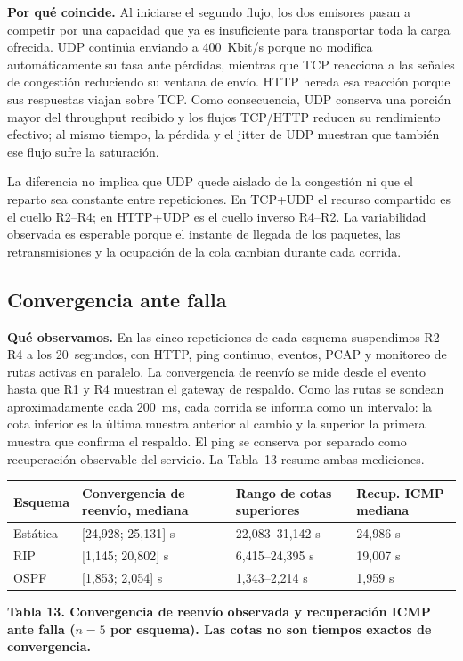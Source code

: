 \documentclass[11pt,a4paper]{article}
\newcommand{\figcaption}[1]{\par\noindent\footnotesize\textbf{#1}\par\vspace{0.4cm}}
\begin{document}
\textbf{Por qu\'e coincide.} Al iniciarse el segundo flujo, los dos emisores pasan a competir por una capacidad que ya es insuficiente para transportar toda la carga ofrecida. UDP contin\'ua enviando a 400~Kbit/s porque no modifica autom\'aticamente su tasa ante p\'erdidas, mientras que TCP reacciona a las se\~nales de congesti\'on reduciendo su ventana de env\'io. HTTP hereda esa reacci\'on porque sus respuestas viajan sobre TCP. Como consecuencia, UDP conserva una porci\'on mayor del throughput recibido y los flujos TCP/HTTP reducen su rendimiento efectivo; al mismo tiempo, la p\'erdida y el jitter de UDP muestran que tambi\'en ese flujo sufre la saturaci\'on.

La diferencia no implica que UDP quede aislado de la congesti\'on ni que el reparto sea constante entre repeticiones. En TCP+UDP el recurso compartido es el cuello R2--R4; en HTTP+UDP es el cuello inverso R4--R2. La variabilidad observada es esperable porque el instante de llegada de los paquetes, las retransmisiones y la ocupaci\'on de la cola cambian durante cada corrida.

\subsection*{Convergencia ante falla}

\textbf{Qu\'e observamos.} En las cinco repeticiones de cada esquema suspendimos R2--R4 a los 20~segundos, con HTTP, ping continuo, eventos, PCAP y monitoreo de rutas activas en paralelo. La convergencia de reenv\'io se mide desde el evento hasta que R1 y R4 muestran el gateway de respaldo. Como las rutas se sondean aproximadamente cada 200~ms, cada corrida se informa como un intervalo: la cota inferior es la \`ultima muestra anterior al cambio y la superior la primera muestra que confirma el respaldo. El ping se conserva por separado como recuperaci\'on observable del servicio. La Tabla~13 resume ambas mediciones.

\needspace{1cm}
\begin{center}
\begin{minipage}{0.96\linewidth}
\centering
\small
\renewcommand{\arraystretch}{1.2}
\setlength{\tabcolsep}{4pt}
\begin{tabular}{@{}p{1.8cm}p{5.4cm}p{3.2cm}p{3cm}@{}}
\toprule
\textbf{Esquema} & \textbf{Convergencia de reenv\'io, mediana} & \textbf{Rango de cotas superiores} & \textbf{Recup. ICMP mediana} \\
\midrule
Est\'atica & \cellcolor{red!30}[24,928; 25,131] s & 22,083--31,142 s & 24,986 s \\
RIP & \cellcolor{orange!25}[1,145; 20,802] s & 6,415--24,395 s & 19,007 s \\
OSPF & \cellcolor{green!25}[1,853; 2,054] s & 1,343--2,214 s & 1,959 s \\
\bottomrule
\end{tabular}
\par\vspace{0.1cm}
\figcaption{Tabla 13. Convergencia de reenv\'io observada y recuperaci\'on ICMP ante falla ($n=5$ por esquema). Las cotas no son tiempos exactos de convergencia.}
\end{minipage}
\end{center}
\end{document}
